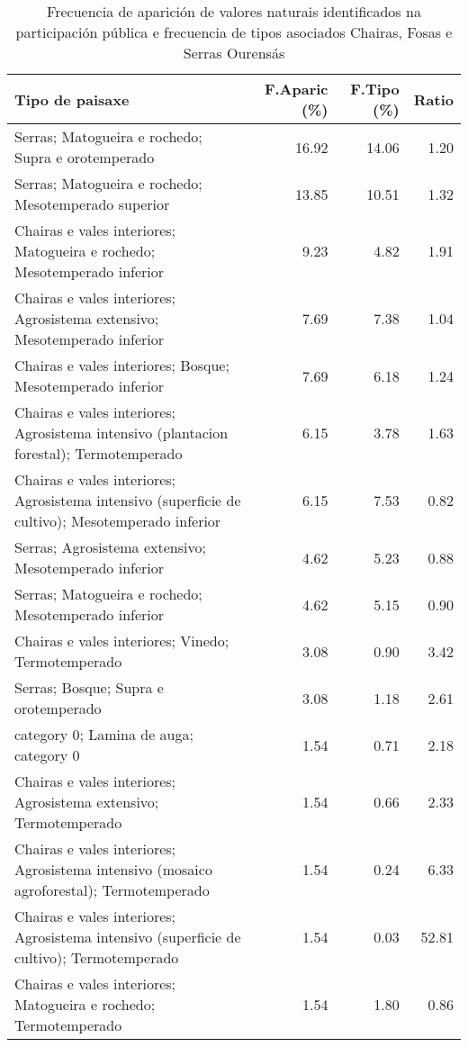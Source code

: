 \begin{table}[p]
\centering
\caption{Frecuencia de aparición de valores naturais identificados na participación pública e frecuencia de tipos asociados Chairas, Fosas e Serras Ourensás} 
\label{vsixotnat8}
\begin{tabular}{lrrr}
  \hline
Tipo de paisaxe & F.Aparic (\%) & F.Tipo (\%) & Ratio \\ 
  \hline
Serras; Matogueira e rochedo; Supra e orotemperado & 16.92 & 14.06 & 1.20 \\ 
  Serras; Matogueira e rochedo; Mesotemperado superior & 13.85 & 10.51 & 1.32 \\ 
  Chairas e vales interiores; Matogueira e rochedo; Mesotemperado inferior & 9.23 & 4.82 & 1.91 \\ 
  Chairas e vales interiores; Agrosistema extensivo; Mesotemperado inferior & 7.69 & 7.38 & 1.04 \\ 
  Chairas e vales interiores; Bosque; Mesotemperado inferior & 7.69 & 6.18 & 1.24 \\ 
  Chairas e vales interiores; Agrosistema intensivo (plantacion forestal); Termotemperado & 6.15 & 3.78 & 1.63 \\ 
  Chairas e vales interiores; Agrosistema intensivo (superficie de cultivo); Mesotemperado inferior & 6.15 & 7.53 & 0.82 \\ 
  Serras; Agrosistema extensivo; Mesotemperado inferior & 4.62 & 5.23 & 0.88 \\ 
  Serras; Matogueira e rochedo; Mesotemperado inferior & 4.62 & 5.15 & 0.90 \\ 
  Chairas e vales interiores; Vinedo; Termotemperado & 3.08 & 0.90 & 3.42 \\ 
  Serras; Bosque; Supra e orotemperado & 3.08 & 1.18 & 2.61 \\ 
  category 0; Lamina de auga; category 0 & 1.54 & 0.71 & 2.18 \\ 
  Chairas e vales interiores; Agrosistema extensivo; Termotemperado & 1.54 & 0.66 & 2.33 \\ 
  Chairas e vales interiores; Agrosistema intensivo (mosaico agroforestal); Termotemperado & 1.54 & 0.24 & 6.33 \\ 
  Chairas e vales interiores; Agrosistema intensivo (superficie de cultivo); Termotemperado & 1.54 & 0.03 & 52.81 \\ 
  Chairas e vales interiores; Matogueira e rochedo; Termotemperado & 1.54 & 1.80 & 0.86 \\ 

\end{tabular}
\end{table}
